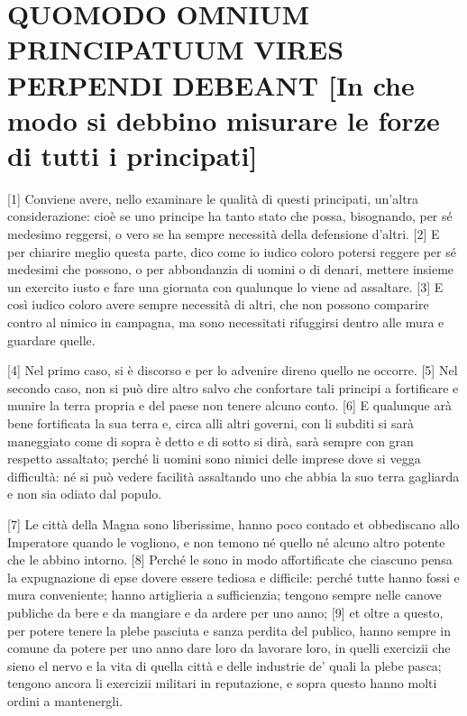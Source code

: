 \quebra\section{QUOMODO OMNIUM PRINCIPATUUM VIRES PERPENDI DEBEANT
{[}In che modo si debbino misurare le forze di tutti i principati{]}}

{[}1{]} Conviene avere, nello examinare le qualità di questi principati,
un'altra considerazione: cioè se uno principe ha tanto stato che possa,
bisognando, per sé medesimo reggersi, o vero se ha sempre necessità
della defensione d'altri. {[}2{]} E per chiarire meglio questa parte,
dico come io iudico coloro potersi reggere per sé medesimi che possono,
o per abbondanzia di uomini o di denari, mettere insieme un exercito
iusto e fare una giornata con qualunque lo viene ad assaltare. {[}3{]} E
così iudico coloro avere sempre necessità di altri, che non possono
comparire contro al nimico in campagna, ma sono necessitati rifuggirsi
dentro alle mura e guardare quelle.

{[}4{]} Nel primo caso, si è discorso e per lo advenire direno quello ne
occorre. {[}5{]} Nel secondo caso, non si può dire altro salvo che
confortare tali principi a fortificare e munire la terra propria e del
paese non tenere alcuno conto. {[}6{]} E qualunque arà bene fortificata
la sua terra e, circa alli altri governi, con li subditi si sarà
maneggiato come di sopra è detto e di sotto si dirà, sarà sempre con
gran respetto assaltato; perché li uomini sono nimici delle imprese dove
si vegga difficultà: né si può vedere facilità assaltando uno che abbia
la suo terra gagliarda e non sia odiato dal populo.

{[}7{]} Le città della Magna sono liberissime, hanno poco contado et
obbediscano allo Imperatore quando le vogliono, e non temono né quello
né alcuno altro potente che le abbino intorno. {[}8{]} Perché le sono in
modo affortificate che ciascuno pensa la expugnazione di epse dovere
essere tediosa e difficile: perché tutte hanno fossi e mura conveniente;
hanno artiglieria a sufficienzia; tengono sempre nelle canove publiche
da bere e da mangiare e da ardere per uno anno; {[}9{]} et oltre a
questo, per potere tenere la plebe pasciuta e sanza perdita del publico,
hanno sempre in comune da potere per uno anno dare loro da lavorare
loro, in quelli exercizii che sieno el nervo e la vita di quella città e
delle industrie de' quali la plebe pasca; tengono ancora li exercizii
militari in reputazione, e sopra questo hanno molti ordini a
mantenergli.

